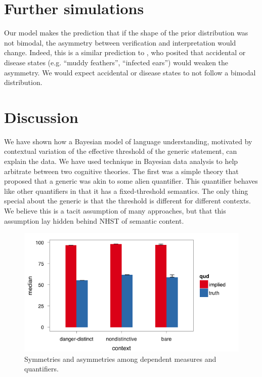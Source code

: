 \documentclass[10pt,letterpaper]{article}
\begin{document}
\section{Further simulations}

Our model makes the prediction that if the shape of the prior distribution was not bimodal, the asymmetry between verification and interpretation would change. Indeed, this is a similar prediction to , who posited that accidental or disease states (e.g. ``muddy feathers'', ``infected ears'') would weaken the asymmetry. We would expect accidental or disease states to not follow a bimodal distribution. 
 

\section{Discussion}

We have shown how a Bayesian model of language understanding, motivated by contextual variation of the effective threshold of the generic statement, can explain the data. We have used technique in Bayesian data analysis to help arbitrate between two cognitive theories. The first was a simple theory that proposed that a generic was akin to some alien quantifier. This quantifier behaves like other quantifiers in that it has a fixed-threshold semantics. The only thing special about the generic is that the threshold is different for different contexts. We believe this is a tacit assumption of many approaches, but that this assumption lay hidden behind NHST of semantic content.

\begin{figure}
\centering
    \includegraphics[width=\columnwidth]{asymmetry_byContext_condTwice}
    \caption{Symmetries and asymmetries among dependent measures and quantifiers.}
  \label{fig:asymmetry}
\end{figure}
\end{document}
